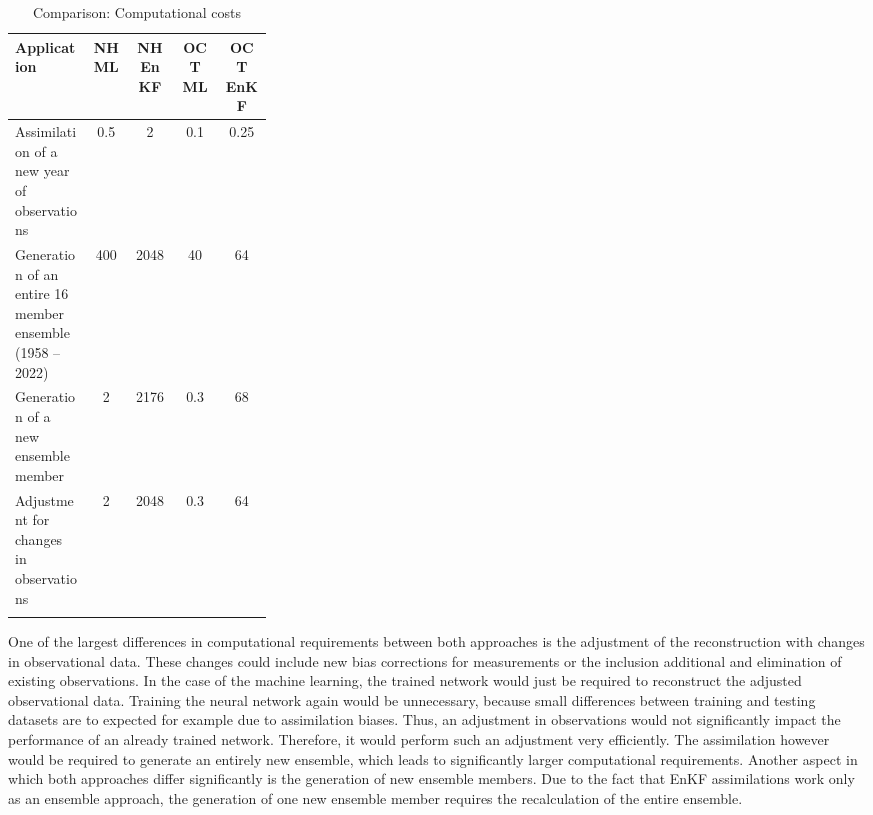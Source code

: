\documentclass[Masterarbeit.tex]{subfile}
\begin{document}
	\begin{table}[h]
		\begin{center}
			\caption{Comparison: Computational costs}
			\begin{tabularx}{\linewidth}{ p{0.3\linewidth}|c|c|c|c }
				Application & NH ML & NH EnKF & OCT ML & OCT EnKF \\ 
				\hline
				Assimilation of a new year of observations & 0.5 & 2 & 0.1 & 0.25\\ 
				\hline
				Generation of an entire 16 member ensemble (1958 -- 2022) & 400 & 2048 & 40 & 64  \\ 
				\hline
				Generation of a new ensemble member & 2 & 2176 & 0.3 & 68 \\
				\hline
				Adjustment for changes in observations & 2 & 2048 & 0.3 & 64 \\
				\label{table:resources}
			\end{tabularx}
		\end{center}
		\label{Tab:costs}
	\end{table}
	
	
	One of the largest differences in computational requirements between both approaches is the adjustment of the reconstruction with changes in observational data. These changes could include new bias corrections for measurements or the inclusion additional and elimination of existing observations. In the case of the machine learning, the trained network would just be required to reconstruct the adjusted observational data. Training the neural network again would be unnecessary, because small differences between training and testing datasets are to expected for example due to assimilation biases. Thus, an adjustment in observations would not significantly impact the performance of an already trained network. Therefore, it would perform such an adjustment very efficiently. The assimilation however would be required to generate an entirely new ensemble, which leads to significantly larger computational requirements. Another aspect in which both approaches differ significantly is the generation of new ensemble members. Due to the fact that EnKF assimilations work only as an ensemble approach, the generation of one new ensemble member requires the recalculation of the entire ensemble. \\
	
\end{document}
